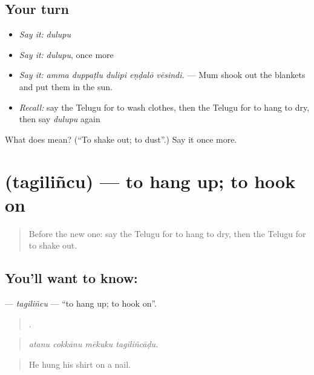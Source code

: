 \subsection*{Your turn}
\begin{itemize}
\raggedright
  \item \emph{Say it:} \emph{dulupu}
  \item \emph{Say it:} \emph{dulupu}, once more
  \item \emph{Say it:} \emph{amma duppaṭlu dulipi eṇḍalō vēsindi.} — Mum shook out the blankets and put them in the sun.
  \item \emph{Recall:} say the Telugu for to wash clothes, then the Telugu for to hang to dry, then say \emph{dulupu} again
\end{itemize}

\begin{tcolorbox}[breakable,colback=teal!4,colframe=teal!35!black,title={Before you move on}]
What does  mean? (\textquotedblleft{}To shake out; to dust\textquotedblright{}.) Say it once more.
\end{tcolorbox}
\section[\texorpdfstring{\te{తగిలించు} (tagiliñcu)}{తగిలించు (tagiliñcu)}]{ (tagiliñcu) — to hang up; to hook on}

\label{lesson:TE-C547-tagilincu}



\begin{quote}
Before the new one: say the Telugu for to hang to dry, then the Telugu for to shake out.
\end{quote}

\subsection*{You'll want to know: }
\textbf{} — \emph{tagiliñcu} — \textquotedblleft{}to hang up; to hook on\textquotedblright{}.

\begin{quote}
   .
\end{quote}

\begin{quote}
\emph{atanu cokkānu mēkuku tagiliñcāḍu.}
\end{quote}

\begin{quote}
He hung his shirt on a nail.
\end{quote}

